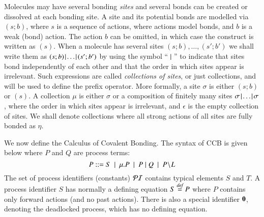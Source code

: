 Molecules may have several bonding \emph{sites} and several bonds can be created or dissolved at each bonding site. A site and its potential bonds are modelled via $(s;b)$, where $s$ is a sequence of actions, where actions model bonds, and $b$ is a weak (bond) action. The action $b$ can be omitted, in which case the construct is written as $(s)$. When a molecule has several sites 
$(s;b), \ldots,(s';b')$ we shall write them as $(s;b) \!\mid\!  \ldots \!\mid\! (s';b')$ by using the symbol ``$\; \vert \;$'' to indicate that sites bond independently of each other and that the order in which sites appear is irrelevant. Such expressions are called \emph{collections of sites}, or just collections, and will be used to define the prefix operator. More formally, a site $\sigma$
is either $(s;b)$ or $(s)$. A collection $\mu$ is either 
$\sigma$ or a composition of finitely many sites $\sigma\!\mid\!\ldots\!\mid\! \sigma$, where the order in which sites appear is irrelevant,
and $\epsilon$ is the empty collection of sites. We shall denote collections where all strong actions of all sites are fully bonded as $\eta$.


We now define the Calculus of Covalent Bonding. The syntax of CCB is given 
below where $P$ and $Q$ are process terms:
$$P ::=  S \ \mid \ \mu.P \ \mid \ P\; \vert \; Q \ \mid \ P\!\setminus\!L $$
%
The set of process identifiers (constants) $\mathcal{PI}$ contains typical elements $S$ and $T$. 
A process identifier $S$ has normally a defining equation $S\stackrel{\emph{def}}{=} P$ where $P$ contains only forward 
actions (and no past actions). There is also a special identifier
 $\mathbf{0}$, denoting the deadlocked process, which has no defining equation.

